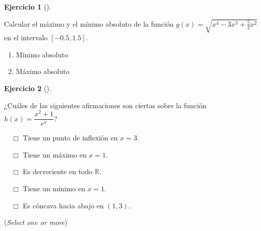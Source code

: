 \documentclass[
  a4paper,
]{scrreport}
\theoremstyle{definition}
\newtheorem{exercise}{Ejercicio}[chapter]
\theoremstyle{remark}
\begin{document}
\begin{exercise}[]\protect\hypertarget{exr-extremos-absolutos}{}\label{exr-extremos-absolutos}

Calcular el máximo y el mínimo absoluto de la función
\(g(x)=\sqrt{x^4-3x^3+\frac{5}{2}x^2}\) en el intervalo \([-0.5,1.5]\).

\begin{enumerate}
\def\labelenumi{\alph{enumi}.}
\item
  Mínimo absoluto

  \vspace{18pt}
\item
  Máximo absoluto

  \vspace{18pt}
\end{enumerate}

\end{exercise}

\begin{exercise}[]\protect\hypertarget{exr-extremos-puntos-inflexion}{}\label{exr-extremos-puntos-inflexion}

¿Cuáles de las siguientes afirmaciones son ciertas sobre la función
\(h(x)=\dfrac{x^2+1}{e^x}\)?

${\quad\Box}$ Tiene un punto de inflexión en $x=3$.

${\quad\Box}$ Tiene un máximo en $x=1$.

${\quad\Box}$ Es decreciente en todo $\mathbb{R}$.

${\quad\Box}$ Tiene un mínimo en $x=1$.

${\quad\Box}$ Es cóncava hacia abajo en $(1,3)$.

(\emph{Select one or more})

\end{exercise}
\end{document}
